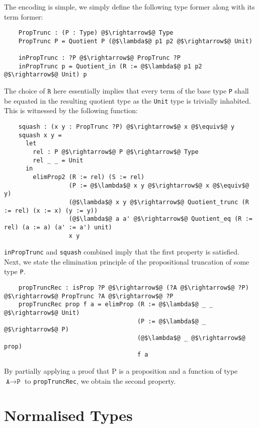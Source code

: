 \documentclass[12pt,twoside,maitrise]{dms}
\theoremstyle{definition}
\numberwithin{equation}{section}
\numberwithin{table}{chapter}
\numberwithin{figure}{chapter}
\newcommand\id[1] {\texttt{#1}}
\begin{document}
The encoding is simple, we simply define the following type former along with its term former:

\begin{verbatim}
    PropTrunc : (P : Type) @$\rightarrow$@ Type
    PropTrunc P = Quotient P (@$\lambda$@ p1 p2 @$\rightarrow$@ Unit)

    inPropTrunc : ?P @$\rightarrow$@ PropTrunc ?P
    inPropTrunc p = Quotient_in (R := @$\lambda$@ p1 p2 @$\rightarrow$@ Unit) p
\end{verbatim}

The choice of $\id{R}$ here essentially implies that every term of the base type
\id{P} shall be equated in the resulting quotient type as the \id{Unit} type is
trivially inhabited. This is witnessed by the following function:

\begin{verbatim}
    squash : (x y : PropTrunc ?P) @$\rightarrow$@ x @$\equiv$@ y
    squash x y =
      let
        rel : P @$\rightarrow$@ P @$\rightarrow$@ Type
        rel _ _ = Unit
      in
        elimProp2 (R := rel) (S := rel)
                  (P := @$\lambda$@ x y @$\rightarrow$@ x @$\equiv$@ y)
                  (@$\lambda$@ x y @$\rightarrow$@ Quotient_trunc (R := rel) (x := x) (y := y))
                  (@$\lambda$@ a a' @$\rightarrow$@ Quotient_eq (R := rel) (a := a) (a' := a') unit)
                  x y
\end{verbatim}

\id{inPropTrunc} and \id{squash} combined imply that the first property is satisfied. Next, we state the elimination principle of the propositional truncation of some type \id{P}.

\begin{verbatim}
    propTruncRec : isProp ?P @$\rightarrow$@ (?A @$\rightarrow$@ ?P) @$\rightarrow$@ PropTrunc ?A @$\rightarrow$@ ?P
    propTruncRec prop f a = elimProp (R := @$\lambda$@ _ _ @$\rightarrow$@ Unit)
                                     (P := @$\lambda$@ _ @$\rightarrow$@ P)
                                     (@$\lambda$@ _ @$\rightarrow$@ prop)
                                     f a
\end{verbatim}

By partially applying a proof that P is a proposition and a function of type
$\id{A} \rightarrow \id{P}$ to \id{propTruncRec}, we obtain the second property.

\section{Normalised Types}
\end{document}
